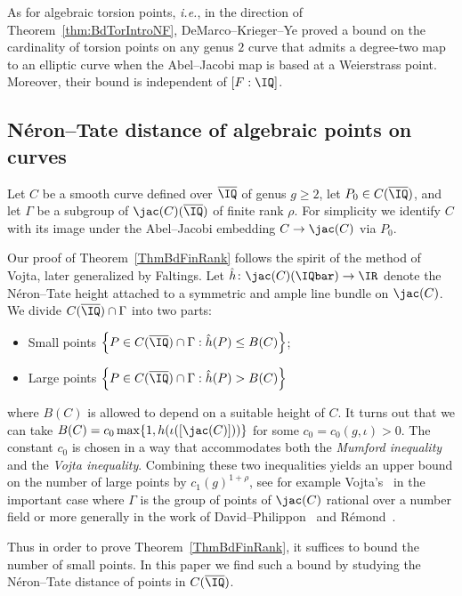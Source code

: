 As for algebraic torsion points, \textit{i.e.}, in the direction of  Theorem~\ref{thm:BdTorIntroNF}, DeMarco--Krieger--Ye \cite{DeMarcoKriegerYeUniManinMumford} proved a bound on the cardinality of torsion points on any genus $2$
curve that admits a degree-two map to an elliptic curve when the
Abel--Jacobi map is based at a Weierstrass point. Moreover, their bound is
independent of $[F:\IQ]$.


\subsection{N\'{e}ron--Tate distance of algebraic points on curves}
\label{subsec:ntdist}
Let $C$ be a smooth curve defined over $\overline \IQ$ of genus $g \ge
2$, let $P_0 \in C(\overline \IQ)$, and let $\Gamma$ be a subgroup of
$\jac(C)(\overline \IQ)$ of finite rank $\rho$. For simplicity we identify $C$ with its image under the Abel--Jacobi embedding $C \rightarrow \jac(C)$ via $P_0$.

Our proof of Theorem~\ref{ThmBdFinRank} follows the spirit of the
method of Vojta, later generalized by  Faltings.
Let $\hat h\colon \jac(C)(\IQbar)\rightarrow \IR$ denote the
N\'eron--Tate height attached to a symmetric and ample line bundle on $\jac(C)$.
We divide $C(\overline \IQ) \cap \Gamma$ into two parts:
\begin{itemize}
\item Small points $\left\{P \in C(\overline \IQ) \cap \Gamma
: \hat{h}(P) \le B(C)  \right\}$;
\item Large points $\left\{P \in C(\overline \IQ) \cap \Gamma : \hat{h}(P) > B(C) \right\}$
\end{itemize}
where $B(C)$ is allowed to depend on a suitable height of $C$. It
turns out that
we can take $B(C)=c_0 \max\{1,h(\iota([\jac(C)]))\}$
for some $c_0 = c_0(g,\iota) > 0$. The constant $c_0$ is chosen in a
way that accommodates  both the \textit{Mumford inequality} and
the \textit{Vojta inequality}. Combining these
two inequalities yields an upper bound on the number of large points
by $c_1(g)^{1+\rho}$, see for example Vojta's~\cite[Theorem
6.1]{Vojta:siegelcompact} in the important case where $\Gamma$ is the
group of points of $\jac(C)$ rational over
 a number field or more generally in the work of
 David--Philippon~\cite{DPvarabII,DaPh:07} and R\'emond~\cite{Remond:Decompte}.



Thus in order to prove Theorem~\ref{ThmBdFinRank}, it suffices to bound the number of small points.
In this paper we find such a  bound by studying the
N\'{e}ron--Tate distance of points in $C(\overline \IQ)$.


